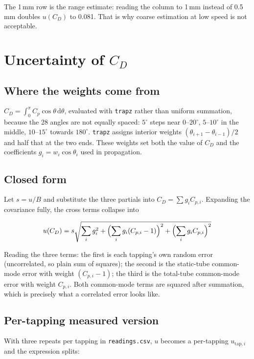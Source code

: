 \documentclass[11pt,a4paper]{article}
\newcommand{\Cp}{\ensuremath{C_p}}
\newcommand{\CD}{\ensuremath{C_D}}
\begin{document}
The 1\,mm row is the range estimate: reading the column to 1\,mm instead of 0.5\,mm doubles
$u(\CD)$ to 0.081. That is why coarse estimation at low speed is not acceptable.

\section{Uncertainty of \CD}

\subsection{Where the weights come from}

$\CD = \int_0^{\pi} \Cp \cos\theta \,\mathrm{d}\theta$, evaluated with \texttt{trapz} rather than
uniform summation, because the 28 angles are not equally spaced: $5^\circ$ steps near
$0$--$20^\circ$, $5$--$10^\circ$ in the middle, $10$--$15^\circ$ towards $180^\circ$. \texttt{trapz}
assigns interior weights $(\theta_{i+1} - \theta_{i-1})/2$ and half that at the two ends. These
weights set both the value of \CD{} and the coefficients $g_i = w_i \cos\theta_i$ used in propagation.

\subsection{Closed form}

Let $s = u/B$ and substitute the three partials into $\CD = \sum g_i C_{p,i}$. Expanding the covariance
fully, the cross terms collapse into

\begin{equation}
u(\CD) = s\sqrt{\sum_i g_i^2 + \Bigl(\sum_i g_i (C_{p,i} - 1)\Bigr)^2 + \Bigl(\sum_i g_i C_{p,i}\Bigr)^2}
\end{equation}

Reading the three terms: the first is each tapping's own random error (uncorrelated, so plain
sum of squares); the second is the static-tube common-mode error with weight $(C_{p,i} - 1)$; the third
is the total-tube common-mode error with weight $C_{p,i}$. Both common-mode terms are squared after
summation, which is precisely what a correlated error looks like.

\subsection{Per-tapping measured version}

With three repeats per tapping in \texttt{readings.csv}, $u$ becomes a per-tapping
$u_{\text{tap},i}$ and the expression splits:
\end{document}
